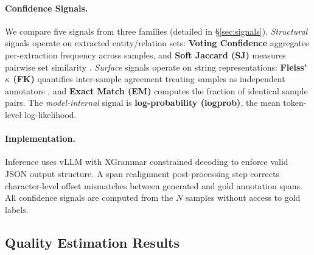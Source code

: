 \paragraph{Confidence Signals.}
We compare five signals from three families (detailed in \S\ref{sec:signals}).
\textit{Structural} signals operate on extracted entity/relation sets: \textbf{Voting Confidence} aggregates per-extraction frequency across samples, and \textbf{Soft Jaccard (SJ)} measures pairwise set similarity \cite{jaccard1901distribution}.
\textit{Surface} signals operate on string representations: \textbf{Fleiss' $\kappa$ (FK)} quantifies inter-sample agreement treating samples as independent annotators \cite{fleiss1971agreement}, and \textbf{Exact Match (EM)} computes the fraction of identical sample pairs.
The \textit{model-internal} signal is \textbf{log-probability (logprob)}, the mean token-level log-likelihood.

\paragraph{Implementation.}
Inference uses vLLM with XGrammar constrained decoding \cite{willard2023guided} to enforce valid JSON output structure.
A span realignment post-processing step corrects character-level offset mismatches between generated and gold annotation spans.
All confidence signals are computed from the $N$ samples without access to gold labels.

\subsection{Quality Estimation Results}
\label{sec:qe_results}

